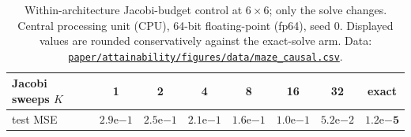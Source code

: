 \begin{table}[htbp]
  \centering
  \caption{Within-architecture Jacobi-budget control at $6\times6$; only the solve
  changes. Central processing unit (CPU), 64-bit floating-point (fp64), seed
  0. Displayed values are rounded conservatively
  against the exact-solve arm. Data:
  \href{https://github.com/vanshsehrawat14/gabp-sparse-inv/blob/main/paper/attainability/figures/data/maze_causal.csv}
{\nolinkurl{paper/attainability/figures/data/maze_causal.csv}}.}
  \label{tab:maze-causal}
  \begin{tabular}{lccccccc}
    \toprule
    Jacobi sweeps $K$ & 1 & 2 & 4 & 8 & 16 & 32 & exact \\
    \midrule
    test MSE & $2.9\mathrm{e}{-1}$ & $2.5\mathrm{e}{-1}$ & $2.1\mathrm{e}{-1}$ & $1.6\mathrm{e}{-1}$ & $1.0\mathrm{e}{-1}$ & $5.2\mathrm{e}{-2}$ & $\mathbf{1.2\mathrm{e}{-5}}$ \\
    \bottomrule
  \end{tabular}
\end{table}

